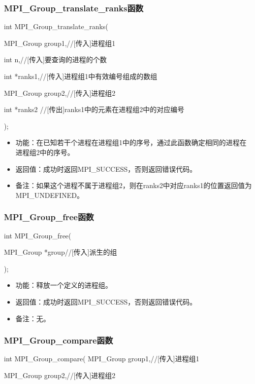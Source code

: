 \documentclass[UTF8]{article}%
\begin{document}
\subsubsection{MPI\_Group\_translate\_ranks函数}

int MPI\_Group\_translate\_ranks(

    \qquad MPI\_Group         group1,//[传入]进程组1

    \qquad int                n,//[传入]要查询的进程的个数

    \qquad int                *ranks1,//[传入]进程组1中有效编号组成的数组

    \qquad MPI\_Group         group2,//[传入]进程组2

    \qquad int                *ranks2 //[传出]ranks1中的元素在进程组2中的对应编号

);

\begin{itemize}
    \item 功能：在已知若干个进程在进程组1中的序号，通过此函数确定相同的进程在进程组2中的序号。
    \item 返回值：成功时返回MPI\_SUCCESS，否则返回错误代码。
    \item 备注：如果这个进程不属于进程组2，则在ranks2中对应ranks1的位置返回值为MPI\_UNDEFINED。
\end{itemize}

\subsubsection{MPI\_Group\_free函数}

int MPI\_Group\_free(

   MPI\_Group *group//[传入]派生的组

);

\begin{itemize}
    \item 功能：释放一个定义的进程组。
    \item 返回值：成功时返回MPI\_SUCCESS，否则返回错误代码。
    \item 备注：无。
\end{itemize}

\subsubsection{MPI\_Group\_compare函数}

int MPI\_Group\_compare(
    \qquad MPI\_Group group1,//[传入]进程组1

    \qquad MPI\_Group group2,//[传入]进程组2
\end{document}
